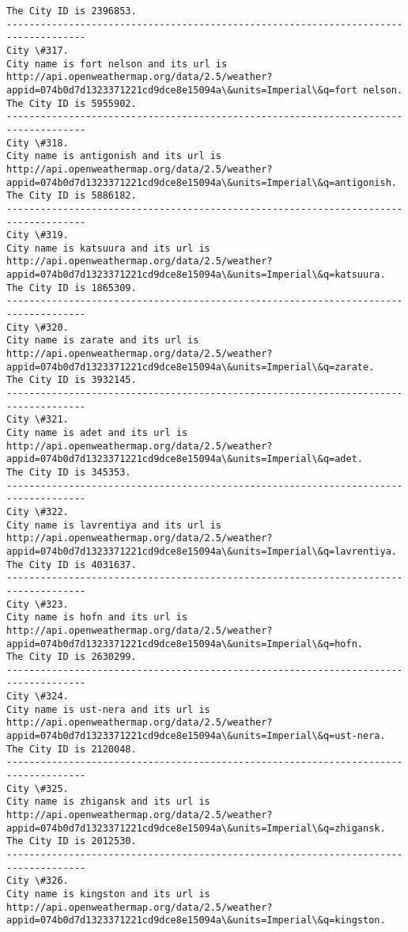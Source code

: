 \documentclass[11pt]{article}
\begin{document}
\begin{Verbatim}[commandchars=\\\{\}]
The City ID is 2396853.
------------------------------------------------------------------------------------
City \#317.
City name is fort nelson and its url is http://api.openweathermap.org/data/2.5/weather?appid=074b0d7d1323371221cd9dce8e15094a\&units=Imperial\&q=fort nelson.
The City ID is 5955902.
------------------------------------------------------------------------------------
City \#318.
City name is antigonish and its url is http://api.openweathermap.org/data/2.5/weather?appid=074b0d7d1323371221cd9dce8e15094a\&units=Imperial\&q=antigonish.
The City ID is 5886182.
------------------------------------------------------------------------------------
City \#319.
City name is katsuura and its url is http://api.openweathermap.org/data/2.5/weather?appid=074b0d7d1323371221cd9dce8e15094a\&units=Imperial\&q=katsuura.
The City ID is 1865309.
------------------------------------------------------------------------------------
City \#320.
City name is zarate and its url is http://api.openweathermap.org/data/2.5/weather?appid=074b0d7d1323371221cd9dce8e15094a\&units=Imperial\&q=zarate.
The City ID is 3932145.
------------------------------------------------------------------------------------
City \#321.
City name is adet and its url is http://api.openweathermap.org/data/2.5/weather?appid=074b0d7d1323371221cd9dce8e15094a\&units=Imperial\&q=adet.
The City ID is 345353.
------------------------------------------------------------------------------------
City \#322.
City name is lavrentiya and its url is http://api.openweathermap.org/data/2.5/weather?appid=074b0d7d1323371221cd9dce8e15094a\&units=Imperial\&q=lavrentiya.
The City ID is 4031637.
------------------------------------------------------------------------------------
City \#323.
City name is hofn and its url is http://api.openweathermap.org/data/2.5/weather?appid=074b0d7d1323371221cd9dce8e15094a\&units=Imperial\&q=hofn.
The City ID is 2630299.
------------------------------------------------------------------------------------
City \#324.
City name is ust-nera and its url is http://api.openweathermap.org/data/2.5/weather?appid=074b0d7d1323371221cd9dce8e15094a\&units=Imperial\&q=ust-nera.
The City ID is 2120048.
------------------------------------------------------------------------------------
City \#325.
City name is zhigansk and its url is http://api.openweathermap.org/data/2.5/weather?appid=074b0d7d1323371221cd9dce8e15094a\&units=Imperial\&q=zhigansk.
The City ID is 2012530.
------------------------------------------------------------------------------------
City \#326.
City name is kingston and its url is http://api.openweathermap.org/data/2.5/weather?appid=074b0d7d1323371221cd9dce8e15094a\&units=Imperial\&q=kingston.

\end{Verbatim}
\end{document}
